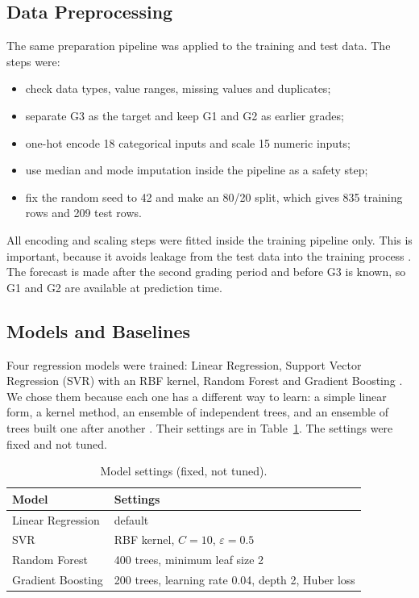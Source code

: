 \documentclass[10pt,twocolumn,a4paper]{article}
\newcommand{\Gthree}{G3}
\newcommand{\Gtwo}{G2}
\newcommand{\Gone}{G1}
\begin{document}
\subsection{Data Preprocessing}
The same preparation pipeline was applied to the training and test data. The steps were:
\begin{itemize}
  \item check data types, value ranges, missing values and duplicates;
  \item separate \Gthree{} as the target and keep \Gone{} and \Gtwo{} as earlier grades;
  \item one-hot encode 18 categorical inputs and scale 15 numeric inputs;
  \item use median and mode imputation inside the pipeline as a safety step;
  \item fix the random seed to 42 and make an 80/20 split, which gives 835 training rows and 209 test rows.
\end{itemize}
All encoding and scaling steps were fitted inside the training pipeline only. This is important, because it avoids leakage from the test data into the training process \cite{kaufman2012}. The forecast is made after the second grading period and before \Gthree{} is known, so \Gone{} and \Gtwo{} are available at prediction time.

\subsection{Models and Baselines}
Four regression models were trained: Linear Regression, Support Vector Regression (SVR) with an RBF kernel, Random Forest \cite{breiman2001} and Gradient Boosting \cite{friedman2001}. We chose them because each one has a different way to learn: a simple linear form, a kernel method, an ensemble of independent trees, and an ensemble of trees built one after another \cite{hastie2009}. Their settings are in Table~\ref{tab:settings}. The settings were fixed and not tuned.

\begin{table}[t]
\centering
\caption{Model settings (fixed, not tuned).}
\label{tab:settings}
\small
\begin{tabular}{lp{4.9cm}}
\toprule
\textbf{Model} & \textbf{Settings}\\
\midrule
Linear Regression & default\\
SVR & RBF kernel, $C=10$, $\varepsilon=0.5$\\
Random Forest & 400 trees, minimum leaf size 2\\
Gradient Boosting & 200 trees, learning rate 0.04, depth 2, Huber loss\\
\bottomrule
\end{tabular}
\end{table}
\end{document}
